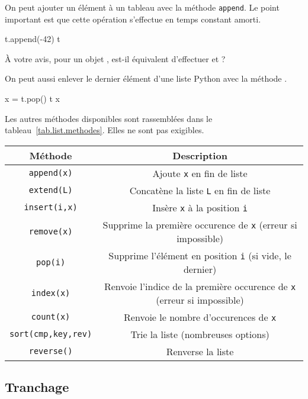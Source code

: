 On peut ajouter un élément à un tableau avec la méthode \texttt{append}. Le point important est que 
cette opération s'effectue en temps constant amorti.
\begin{pyconsole}
t.append(-42)
t
\end{pyconsole}
\`A votre avis, pour un objet , est-il équivalent d'effectuer  et  ?

On peut aussi enlever le dernier élément d'une liste Python avec la méthode .
\begin{pyconsole}
x = t.pop()
t
x
\end{pyconsole}

Les autres méthodes disponibles sont rassemblées dans le tableau~\ref{tab.list.methodes}. Elles ne sont pas exigibles.
  \begin{center}
    \begin{tabular}{|c|c|}
      \hline 
      Méthode & Description \\
      \hline
      \texttt{append(x)} & Ajoute \texttt{x} en fin de liste \\
      \hline
      \texttt{extend(L)} & Concatène la liste \texttt{L} en fin de liste \\
      \hline
      \texttt{insert(i,x)} & Insère  \texttt{x} à la position \texttt{i} \\
      \hline
      \texttt{remove(x)} & Supprime la première occurence de \texttt{x} (erreur si impossible)\\
      \hline
      \texttt{pop(i)} & Supprime l'élément en position \texttt{i} (si vide, le dernier) \\
      \hline 
      \texttt{index(x)} & Renvoie l'indice de la première occurence de \texttt{x} (erreur si impossible)\\
      \hline
      \texttt{count(x)} & Renvoie le nombre d'occurences de \texttt{x} \\
      \hline
      \texttt{sort(cmp,key,rev)} & Trie la liste (nombreuses options) \\
      \hline
      \texttt{reverse()} & Renverse la liste \\
      \hline
    \end{tabular}
  \label{tab.list.methodes}
  \end{center}

%
\subsection{Tranchage}

